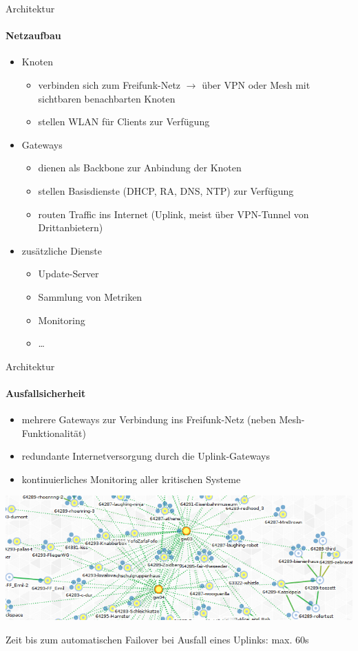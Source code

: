 \documentclass{beamer}
\begin{document}
\begin{frame}{Architektur}
\framesubtitle{Netzaufbau}
\begin{itemize}
	\item Knoten
	\begin{itemize}
		\item verbinden sich zum Freifunk-Netz\newline
		$\rightarrow$ über VPN oder Mesh mit sichtbaren benachbarten Knoten
		\item stellen WLAN für Clients zur Verfügung
	\end{itemize}
	\item Gateways
	\begin{itemize}
		\item dienen als Backbone zur Anbindung der Knoten
		\item stellen Basisdienste (DHCP, RA, DNS, NTP) zur Verfügung
		\item routen Traffic ins Internet (Uplink, meist über VPN-Tunnel von Drittanbietern)
	\end{itemize}
	\item zusätzliche Dienste
	\begin{itemize}
		\item Update-Server
		\item Sammlung von Metriken
		\item Monitoring
		\item \ldots
	\end{itemize}
\end{itemize}
\end{frame}

\begin{frame}{Architektur}
\framesubtitle{Ausfallsicherheit}
\vfill
\begin{itemize}
	\item mehrere Gateways zur Verbindung ins Freifunk-Netz (neben Mesh-Funktionalität)
	\item redundante Internetversorgung durch die Uplink-Gateways
	\item kontinuierliches Monitoring aller kritischen Systeme
\end{itemize}
\begin{center}
\includegraphics[width=\textwidth]{images/ffmap_graph}
\end{center}
\vfill
\small{Zeit bis zum automatischen Failover bei Ausfall eines Uplinks: max. 60s}
\vfill
\end{frame}
\end{document}
